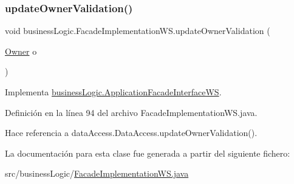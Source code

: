\subsubsection{\texorpdfstring{updateOwnerValidation()}{updateOwnerValidation()}}
{\footnotesize\ttfamily void business\+Logic.\+Facade\+Implementation\+W\+S.\+update\+Owner\+Validation (\begin{DoxyParamCaption}\item[{\mbox{\hyperlink{classdomain_1_1_owner}{Owner}}}]{o }\end{DoxyParamCaption})}



Implementa \mbox{\hyperlink{interfacebusiness_logic_1_1_application_facade_interface_w_s_a4932653f88b16660fa74ff6356a3f94b}{business\+Logic.\+Application\+Facade\+Interface\+WS}}.



Definición en la línea 94 del archivo Facade\+Implementation\+W\+S.\+java.


\begin{DoxyCode}{0}

\end{DoxyCode}


Hace referencia a data\+Access.\+Data\+Access.\+update\+Owner\+Validation().



La documentación para esta clase fue generada a partir del siguiente fichero\+:\begin{DoxyCompactItemize}
\item 
src/business\+Logic/\mbox{\hyperlink{_facade_implementation_w_s_8java}{Facade\+Implementation\+W\+S.\+java}}\end{DoxyCompactItemize}
